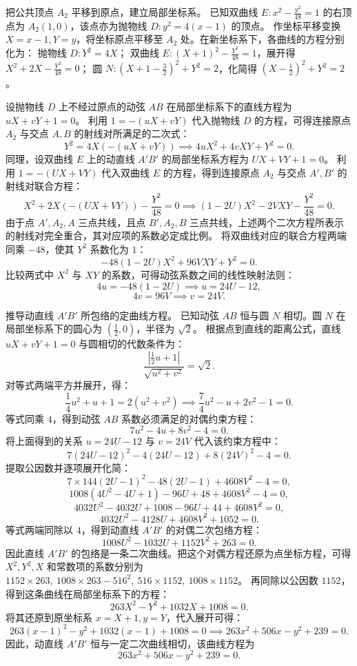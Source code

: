 \begin{solution}
把公共顶点 $A_2$ 平移到原点，建立局部坐标系。
已知双曲线 $E: x^2 - \frac{y^2}{48} = 1$ 的右顶点为 $A_2(1,0)$，该点亦为抛物线 $D: y^2 = 4(x - 1)$ 的顶点。
作坐标平移变换 $X = x - 1, Y = y$，将坐标原点平移至 $A_2$ 处。在新坐标系下，各曲线的方程分别化为：
抛物线 $D: Y^2 = 4X$；
双曲线 $E: (X+1)^2 - \frac{Y^2}{48} = 1$，展开得 $X^2 + 2X - \frac{Y^2}{48} = 0$；
圆 $N: \left(X + 1 - \frac{3}{2}\right)^2 + Y^2 = 2$，化简得 $\left(X - \frac{1}{2}\right)^2 + Y^2 = 2$。

设抛物线 $D$ 上不经过原点的动弦 $AB$ 在局部坐标系下的直线方程为 $uX + vY + 1 = 0$。
利用 $1 = -(uX + vY)$ 代入抛物线 $D$ 的方程，可得连接原点 $A_2$ 与交点 $A, B$ 的射线对所满足的二次式：
\[ Y^2 = 4X(-(uX + vY)) \implies 4uX^2 + 4vXY + Y^2 = 0. \]
同理，设双曲线 $E$ 上的动直线 $A'B'$ 的局部坐标系方程为 $UX + VY + 1 = 0$。
利用 $1 = -(UX + VY)$ 代入双曲线 $E$ 的方程，得到连接原点 $A_2$ 与交点 $A', B'$ 的射线对联合方程：
\[ X^2 + 2X(-(UX + VY)) - \frac{Y^2}{48} = 0 \implies (1 - 2U)X^2 - 2VXY - \frac{Y^2}{48} = 0. \]
由于点 $A', A_2, A$ 三点共线，且点 $B', A_2, B$ 三点共线，上述两个二次方程所表示的射线对完全重合，其对应项的系数必定成比例。
将双曲线对应的联合方程两端同乘 $-48$，使其 $Y^2$ 系数化为 $1$：
\[ -48(1 - 2U)X^2 + 96VXY + Y^2 = 0. \]
比较两式中 $X^2$ 与 $XY$ 的系数，可得动弦系数之间的线性映射法则：
\[ 4u = -48(1 - 2U) \implies u = 24U - 12, \]
\[ 4v = 96V \implies v = 24V. \]

推导动直线 $A'B'$ 所包络的定曲线方程。
已知动弦 $AB$ 恒与圆 $N$ 相切。圆 $N$ 在局部坐标系下的圆心为 $\left(\frac{1}{2}, 0\right)$，半径为 $\sqrt{2}$。
根据点到直线的距离公式，直线 $uX + vY + 1 = 0$ 与圆相切的代数条件为：
\[ \frac{\left|\frac{1}{2}u + 1\right|}{\sqrt{u^2 + v^2}} = \sqrt{2}. \]
对等式两端平方并展开，得：
\[ \frac{1}{4}u^2 + u + 1 = 2(u^2 + v^2) \implies \frac{7}{4}u^2 - u + 2v^2 - 1 = 0. \]
等式同乘 $4$，得到动弦 $AB$ 系数必须满足的对偶约束方程：
\[ 7u^2 - 4u + 8v^2 - 4 = 0. \]
将上面得到的关系 $u = 24U - 12$ 与 $v = 24V$ 代入该约束方程中：
\[ 7(24U - 12)^2 - 4(24U - 12) + 8(24V)^2 - 4 = 0. \]
提取公因数并逐项展开化简：
\[ 7 \times 144(2U - 1)^2 - 48(2U - 1) + 4608V^2 - 4 = 0, \]
\[ 1008(4U^2 - 4U + 1) - 96U + 48 + 4608V^2 - 4 = 0, \]
\[ 4032U^2 - 4032U + 1008 - 96U + 44 + 4608V^2 = 0, \]
\[ 4032U^2 - 4128U + 4608V^2 + 1052 = 0. \]
等式两端同除以 $4$，得到动直线 $A'B'$ 的对偶二次包络方程：
\[ 1008U^2 - 1032U + 1152V^2 + 263 = 0. \]
因此直线 $A'B'$ 的包络是一条二次曲线。把这个对偶方程还原为点坐标方程，可得 $X^2,Y^2,X$ 和常数项的系数分别为
$1152 \times 263,\ 1008 \times 263 - 516^2,\ 516 \times 1152,\ 1008 \times 1152$。
再同除以公因数 $1152$，得到这条曲线在局部坐标系下的方程：
\[ 263X^2 - Y^2 + 1032X + 1008 = 0. \]
将其还原到原坐标系 $x = X + 1, y = Y$，代入展开可得：
\[ 263(x - 1)^2 - y^2 + 1032(x - 1) + 1008 = 0 \implies 263x^2 + 506x - y^2 + 239 = 0. \]
因此，动直线 $A'B'$ 恒与一定二次曲线相切，该曲线方程为
$$ 263x^2 + 506x - y^2 + 239 = 0. $$


\end{solution}
